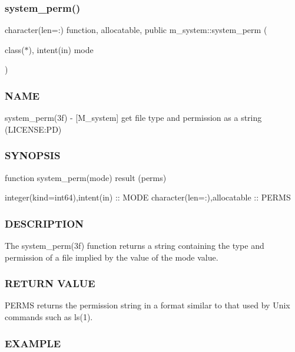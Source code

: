 \subsubsection{\texorpdfstring{system\+\_\+perm()}{system\_perm()}}
{\footnotesize\ttfamily character(len=\+:) function, allocatable, public m\+\_\+system\+::system\+\_\+perm (\begin{DoxyParamCaption}\item[{class($\ast$), intent(in)}]{mode }\end{DoxyParamCaption})}



\subsubsection*{N\+A\+ME}

system\+\_\+perm(3f) -\/ \mbox{[}M\+\_\+system\mbox{]} get file type and permission as a string (L\+I\+C\+E\+N\+SE\+:PD) 

\subsubsection*{S\+Y\+N\+O\+P\+S\+IS}

function system\+\_\+perm(mode) result (perms)

integer(kind=int64),intent(in) \+:\+: M\+O\+DE character(len=\+:),allocatable \+:\+: P\+E\+R\+MS

\subsubsection*{D\+E\+S\+C\+R\+I\+P\+T\+I\+ON}

\begin{DoxyVerb}The system_perm(3f) function returns a string containing the type
and permission of a file implied by the value of the mode value.
\end{DoxyVerb}


\subsubsection*{R\+E\+T\+U\+RN V\+A\+L\+UE}

P\+E\+R\+MS returns the permission string in a format similar to that used by Unix commands such as ls(1).

\subsubsection*{E\+X\+A\+M\+P\+LE}

